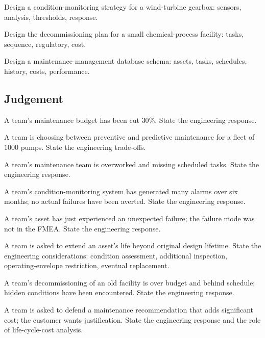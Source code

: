 \begin{exercise}
Design a condition-monitoring strategy for a wind-turbine gearbox: sensors, analysis, thresholds, response.
\end{exercise}

\begin{exercise}
Design the decommissioning plan for a small chemical-process facility: tasks, sequence, regulatory, cost.
\end{exercise}

\begin{exercise}
Design a maintenance-management database schema: assets, tasks, schedules, history, costs, performance.
\end{exercise}

\subsection*{Judgement}

\begin{exercise}
A team's maintenance budget has been cut $30\%$. State the engineering response.
\end{exercise}

\begin{exercise}
A team is choosing between preventive and predictive maintenance for a fleet of $1000$ pumps. State the engineering trade-offs.
\end{exercise}

\begin{exercise}
A team's maintenance team is overworked and missing scheduled tasks. State the engineering response.
\end{exercise}

\begin{exercise}
A team's condition-monitoring system has generated many alarms over six months; no actual failures have been averted. State the engineering response.
\end{exercise}

\begin{exercise}
A team's asset has just experienced an unexpected failure; the failure mode was not in the FMEA. State the engineering response.
\end{exercise}

\begin{exercise}
A team is asked to extend an asset's life beyond original design lifetime. State the engineering considerations: condition assessment, additional inspection, operating-envelope restriction, eventual replacement.
\end{exercise}

\begin{exercise}
A team's decommissioning of an old facility is over budget and behind schedule; hidden conditions have been encountered. State the engineering response.
\end{exercise}

\begin{exercise}
A team is asked to defend a maintenance recommendation that adds significant cost; the customer wants justification. State the engineering response and the role of life-cycle-cost analysis.
\end{exercise}
